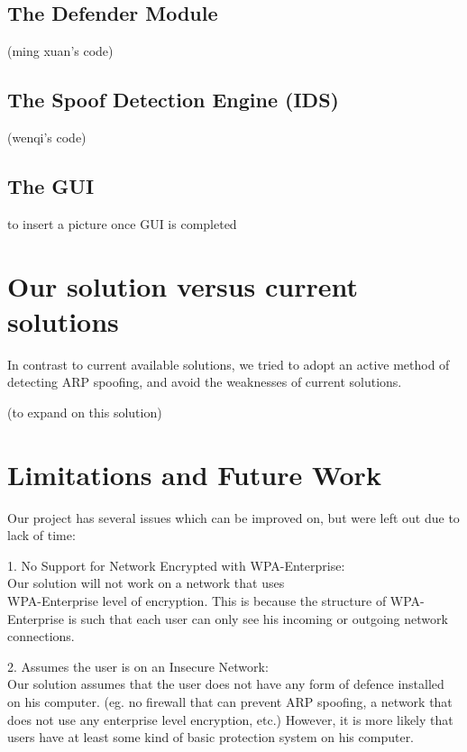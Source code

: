 \documentclass{acm_proc_article-sp}
\begin{document}
\subsection{The Defender Module}

(ming xuan's code) 

\subsection{The Spoof Detection Engine (IDS)}

(wenqi's code)

\subsection{The GUI}

to insert a picture once GUI is completed

\section{Our solution versus current \\solutions}
In contrast to current available solutions, we tried to adopt an active method of detecting ARP spoofing, and avoid the weaknesses of current solutions.  

(to expand on this solution) 

\section{Limitations and Future Work}
Our project has several issues which can be improved on, but were left out due to lack of time: 

1. No Support for Network Encrypted with WPA-Enterprise:\\
Our solution will not work on a network that uses\\ WPA-Enterprise level of encryption. This is because the structure of WPA-Enterprise is such that each user can only see his incoming or outgoing network connections. 

2. Assumes the user is on an Insecure Network: \\
Our solution assumes that the user does not have any form of defence installed on his computer. (eg. no firewall that can prevent ARP spoofing, a network that does not use any enterprise level encryption, etc.) However, it is more likely that users have at least some kind of basic protection system on his computer. 
\end{document}
